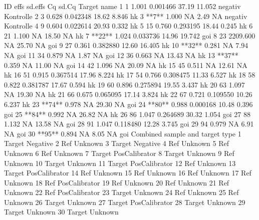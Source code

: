 \documentclass[11pt]{article}
\begin{document}
\begin{Schunk}
\begin{Soutput}
       ID     effs  sd.effs    Cq  sd.Cq       Target name
1       1    1.001 0.001466 37.19 11.052 negativ Kontrolle
2       3    0.628 0.042348 18.62  8.846                hk
3   **7**    1.000       NA  2.49     NA negativ Kontrolle
4       9    0.604 0.022614 20.93  0.332                hk
5      15    0.760 0.293195 18.44  0.245                hk
6      21    1.100       NA 18.50     NA                hk
7  **22**    1.024 0.033736 14.96 19.742               goi
8      23 2209.600       NA 25.70     NA               goi
9      27    0.361 0.382880 12.60 16.405                hk
10 **32**    0.281       NA  7.94     NA               goi
11     34    0.879       NA  1.87     NA               goi
12     36    0.663       NA 13.43     NA                hk
13 **37**    0.359       NA 11.00     NA               goi
14     42    1.096       NA 20.09     NA                hk
15     45    0.511       NA 12.61     NA                hk
16     51    0.915 0.367514 17.96  8.224                hk
17     54    0.766 0.308475 11.33  6.527                hk
18     58    0.822 0.381787 17.67  0.594                hk
19     60    0.896 0.275894 19.55  3.437                hk
20     63    1.097       NA 19.30     NA                hk
21     66    0.675 0.065095 17.14  3.824                hk
22     67    0.721 0.109550 10.26  6.237                hk
23 **74**    0.978       NA 29.30     NA               goi
24 **80**    0.988 0.000168 10.48  0.396               goi
25 **84**    0.992       NA 26.82     NA                hk
26     86    1.047 0.264689 30.32  1.054               goi
27     88    1.132       NA 13.58     NA               goi
28     91    1.047 0.118480 12.28  3.745               goi
29     94    0.979       NA  6.91     NA               goi
30 **95**    0.894       NA  8.05     NA               goi
   Combined sample and target type
1                  Target Negative
2                      Ref Unknown
3                  Target Negative
4                      Ref Unknown
5                      Ref Unknown
6                      Ref Unknown
7             Target PosCalibrator
8                   Target Unknown
9                      Ref Unknown
10                  Target Unknown
11            Target PosCalibrator
12                     Ref Unknown
13            Target PosCalibrator
14                     Ref Unknown
15                     Ref Unknown
16                     Ref Unknown
17                     Ref Unknown
18               Ref PosCalibrator
19                     Ref Unknown
20                     Ref Unknown
21                     Ref Unknown
22               Ref PosCalibrator
23                  Target Unknown
24                     Ref Unknown
25                     Ref Unknown
26                  Target Unknown
27            Target PosCalibrator
28                  Target Unknown
29                  Target Unknown
30                  Target Unknown
\end{Soutput}
\end{Schunk}
\end{document}
